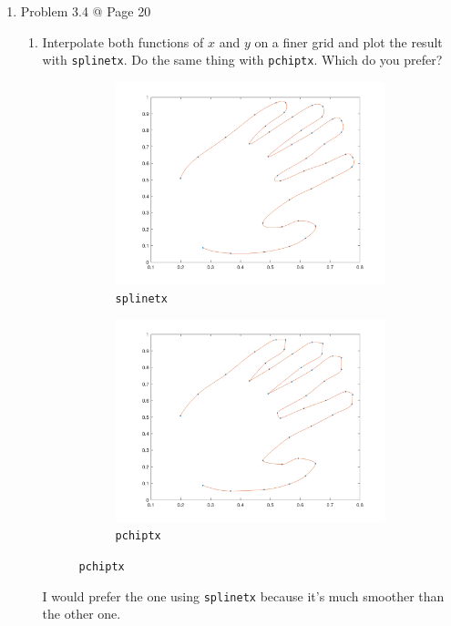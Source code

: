 \documentclass[10pt]{report}
\begin{document}
\begin{enumerate}
	\item 
	Problem 3.4 @ Page 20
	\begin{enumerate}
		\item 
		Interpolate both functions of $x$ and $y$ on a finer grid and plot the result with \verb|splinetx|. Do the same thing with \verb|pchiptx|. Which do you prefer?
		\begin{figure}[H]
			\vspace{-2ex}
			\begin{subfigure}[b]{0.5\linewidth}
				\centering
				\includegraphics[width=\linewidth]{hand_splinetx.png}
				\vspace{-5ex} 
				\caption*{\texttt{splinetx}}
			\end{subfigure}
			\begin{subfigure}[b]{0.5\linewidth}
				\centering
				\includegraphics[width=\linewidth]{hand_pchiptx.png} 
				\vspace{-5ex}
				\caption*{\texttt{pchiptx}}
			\end{subfigure}
		\end{figure}
		I would prefer the one using \verb|splinetx| because it's much smoother than the other one.
		

\end{enumerate}
\end{enumerate}
\end{document}
